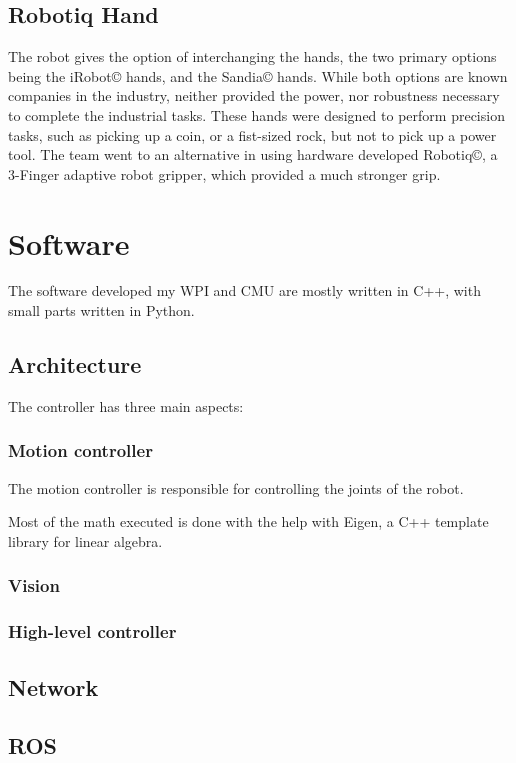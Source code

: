 \documentclass{article}
\begin{document}
\subsection{Robotiq Hand}

The robot gives the option of interchanging the hands, the two primary options being the iRobot© hands, and the Sandia© hands. While both options are known companies in the industry, neither provided the power, nor robustness necessary to complete the industrial tasks. These hands were designed to perform precision tasks, such as picking up a coin, or a fist-sized rock, but not to pick up a power tool. The team went to an alternative in using hardware developed Robotiq©, a 3-Finger adaptive robot gripper, which provided a much stronger grip. 



\section{Software}
The software developed my WPI and CMU are mostly written in C++, with small parts written in Python. 

\subsection{Architecture}

The controller has three main aspects: 

\subsubsection{Motion controller}
The motion controller is responsible for controlling the joints of the robot. 

Most of the math executed is done with the help with Eigen, a C++ template library for linear algebra. 


\subsubsection{Vision}

\subsubsection{High-level controller}


\subsection{Network}
\subsection{ROS}
\end{document}
